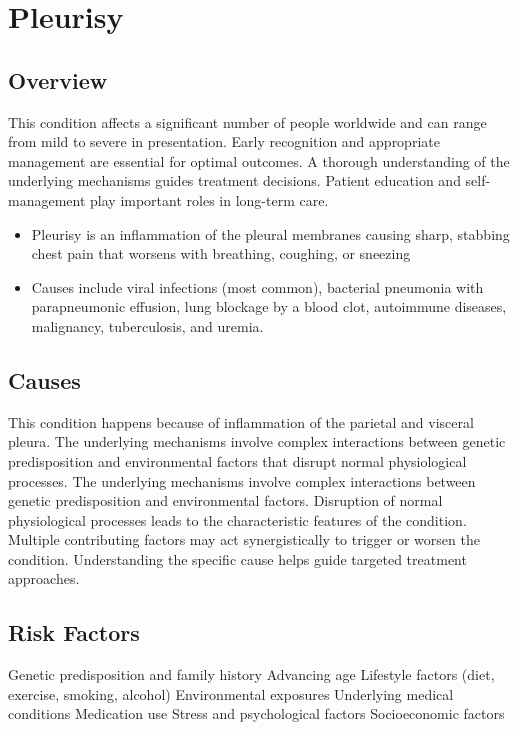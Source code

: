 \chapter{Pleurisy}
\label{sec:Pleurisy}

\section{Overview}
This condition affects a significant number of people worldwide and can range from mild to severe in presentation. Early recognition and appropriate management are essential for optimal outcomes. A thorough understanding of the underlying mechanisms guides treatment decisions. Patient education and self-management play important roles in long-term care.

\begin{itemize}[noitemsep]
  \item Pleurisy is an inflammation of the pleural membranes causing sharp, stabbing chest pain that worsens with breathing, coughing, or sneezing
  \item Causes include viral infections (most common), bacterial pneumonia with parapneumonic effusion, lung blockage by a blood clot, autoimmune diseases, malignancy, tuberculosis, and uremia.
\end{itemize}
\section{Causes}
This condition happens because of inflammation of the parietal and visceral pleura. The underlying mechanisms involve complex interactions between genetic predisposition and environmental factors that disrupt normal physiological processes. The underlying mechanisms involve complex interactions between genetic predisposition and environmental factors. Disruption of normal physiological processes leads to the characteristic features of the condition. Multiple contributing factors may act synergistically to trigger or worsen the condition. Understanding the specific cause helps guide targeted treatment approaches.
\section{Risk Factors}
Genetic predisposition and family history Advancing age Lifestyle factors (diet, exercise, smoking, alcohol) Environmental exposures Underlying medical conditions Medication use Stress and psychological factors Socioeconomic factors

